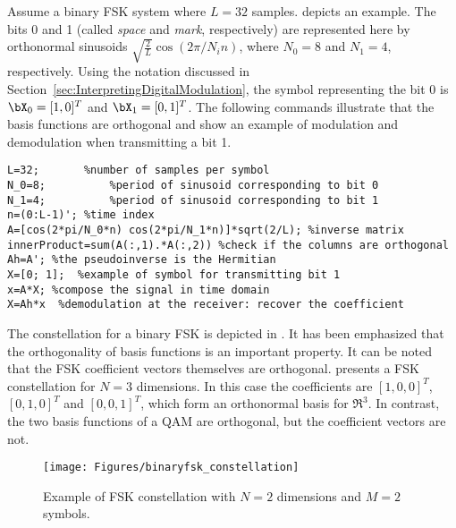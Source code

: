 Assume a binary FSK system where $L=32$ samples.  depicts an example. 
 The bits 0 and 1 (called \emph{space} and \emph{mark}, respectively) are represented here by orthonormal sinusoids $\sqrt{\frac{2}{L}} \cos(2\pi/N_i n)$, where $N_0=8$ and $N_1=4$, respectively. Using the notation discussed in Section~\ref{sec:InterpretingDigitalModulation}, the symbol representing the bit 0 is $\bX_0 = [1, 0]^T$ and $\bX_1 = [0, 1]^T$. The following {\matlab} commands illustrate that the basis functions are orthogonal and show an example of modulation and demodulation when transmitting a bit 1.
\begin{lstlisting}
L=32;       %number of samples per symbol
N_0=8;   		%period of sinusoid corresponding to bit 0
N_1=4;   		%period of sinusoid corresponding to bit 1
n=(0:L-1)'; %time index
A=[cos(2*pi/N_0*n) cos(2*pi/N_1*n)]*sqrt(2/L); %inverse matrix
innerProduct=sum(A(:,1).*A(:,2)) %check if the columns are orthogonal
Ah=A'; %the pseudoinverse is the Hermitian
X=[0; 1];  %example of symbol for transmitting bit 1
x=A*X; %compose the signal in time domain
X=Ah*x  %demodulation at the receiver: recover the coefficient
\end{lstlisting}


The constellation for a binary FSK is depicted in . It has been emphasized that the orthogonality of basis functions is an important property. It can be noted that the FSK coefficient vectors themselves are orthogonal.  presents a FSK constellation for $N=3$ dimensions. In this case the coefficients are $[1, 0, 0]^T$, $[0, 1, 0]^T$ and $[0, 0, 1]^T$, which form an orthonormal basis for $\Re^3$. In contrast, the two basis functions of a QAM are orthogonal, but the coefficient vectors are not.

\begin{figure}[htbp]
	\centering
		\texttt{[image: Figures/binaryfsk\_constellation]}		
	\caption{Example of FSK constellation with $N=2$ dimensions and $M=2$ symbols.\label{fig:binaryfsk_constellation}}
\end{figure}

